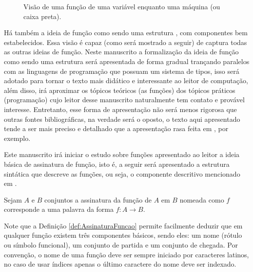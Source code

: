 \begin{figure}[h]
	\centering
	\caption{Visão de uma função de uma variável enquanto uma máquina (ou caixa preta).}
	\label{fig:FuncaoBlackBox}
\end{figure}

Há também a ideia de função como sendo uma estrutura \cite{judith2021}, com componentes bem estabelecidos. Essa visão é capaz (como será mostrado a seguir) de captura todas as outras ideias de função.  Neste manuscrito a formalização da ideia de função como sendo uma estrutura será apresentada de forma gradual trançando paralelos com as linguagens de programação que possuam um sistema de tipos, isso será adotado para tornar o texto mais didático e interessante ao leitor de computação, além disso, irá aproximar os tópicos teóricos (as funções) dos tópicos práticos (programação) cujo leitor desse manuscrito naturalmente tem contato e provável interesse. Entretanto, esse forma de apresentação não será menos rigorosa que outras fontes bibliográficas, na verdade será o oposto, o texto aqui apresentado tende a ser mais preciso e detalhado que a apresentação rasa feita em \cite{judith2021}, por exemplo.

Este manuscrito irá iniciar o estudo sobre funções  apresentado ao leitor a ideia básica de assinatura de função, isto é, a seguir será apresentado a estrutura sintática que descreve as funções, ou seja, o componente descritivo mencionado em \cite{levin2021}.

\begin{definition}\label{def:AssinaturaFuncao}
	Sejam $A$ e $B$ conjuntos a assinatura da função de $A$ em $B$ nomeada como $f$ corresponde a uma palavra da forma $f: A \rightarrow B$.
\end{definition}

Note que a Definição \ref{def:AssinaturaFuncao} permite facilmente deduzir que em qualquer função existem três componentes básicos, sendo eles: um nome (rótulo ou símbolo funcional), um conjunto de partida e um conjunto de chegada. Por convenção, o nome de uma função deve ser sempre iniciado por caracteres latinos, no caso de usar índices apenas o último caractere do nome deve ser indexado.

